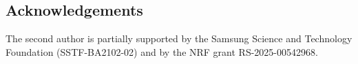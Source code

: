 \documentclass[a4paper, 11pt]{amsart}
\theoremstyle{definition}
\newcommand{\Z}{\mathbb{Z}}
\begin{document}
\subsection*{Acknowledgements}
The second author is partially supported by the Samsung Science and Technology Foundation
(SSTF-BA2102-02) and by the NRF grant RS-2025-00542968.








\end{document}
